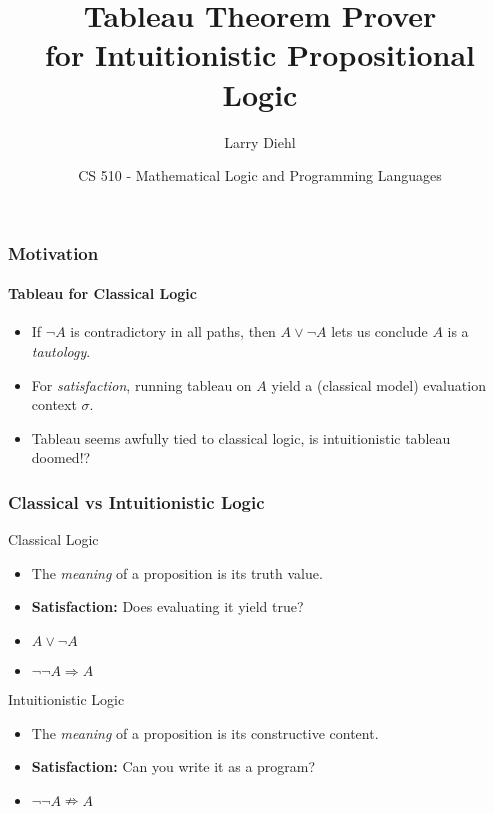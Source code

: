 \documentclass[mathserif]{beamer}
\title{Tableau Theorem Prover\\ for Intuitionistic Propositional Logic}
\author{Larry Diehl}
\institute{Portland State University}
\date[Fall 2014]
{CS 510 - Mathematical Logic and Programming Languages}
\begin{document}
\frame{\titlepage}

\begin{frame}
\frametitle{Motivation}
\framesubtitle{Tableau for Classical Logic}

\begin{itemize}
\item If $\neg A$ is contradictory in all paths, then $A \lor \neg A$
  lets us conclude $A$ is a {\it tautology}.
\item For {\it satisfaction}, running tableau on $A$ yield a
  (classical model) evaluation context $\sigma$.
\item Tableau seems awfully tied to classical logic, is intuitionistic
  tableau doomed!?
\end{itemize}



\end{frame}


\begin{frame}
\frametitle{Classical vs Intuitionistic Logic}



\begin{block}{Classical Logic}
\begin{itemize}
\item The {\it meaning} of a proposition is its truth value.
\item {\bf Satisfaction:} Does evaluating it yield true?
\item $A \lor \neg A$
\item $\neg\neg A \Rightarrow A$
\end{itemize}
\end{block}

\begin{block}{Intuitionistic Logic}
\begin{itemize}
\item The {\it meaning} of a proposition is its constructive content.
\item {\bf Satisfaction:} Can you write it as a program?
\item $\neg\neg A \nRightarrow A$
\end{itemize}
\end{block}

\end{frame}
\end{document}
